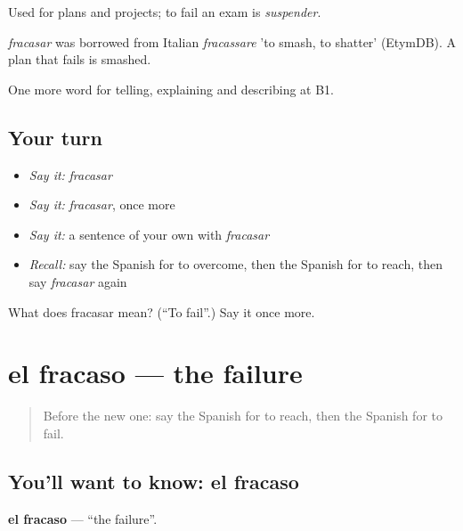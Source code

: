 Used for plans and projects; to fail an exam is \emph{suspender}.

\begin{cousinweb}
\emph{fracasar} was borrowed from Italian \emph{fracassare} 'to smash, to shatter' (EtymDB). A plan that fails is smashed.
\end{cousinweb}

\begin{grammarlens}[title={What you've built}]
One more word for telling, explaining and describing at B1.
\end{grammarlens}

\subsection*{Your turn}
\begin{itemize}
\raggedright
  \item \emph{Say it:} \emph{fracasar}
  \item \emph{Say it:} \emph{fracasar}, once more
  \item \emph{Say it:} a sentence of your own with \emph{fracasar}
  \item \emph{Recall:} say the Spanish for to overcome, then the Spanish for to reach, then say \emph{fracasar} again
\end{itemize}

\begin{tcolorbox}[breakable,colback=teal!4,colframe=teal!35!black,title={Before you move on}]
What does fracasar mean? (\textquotedblleft{}To fail\textquotedblright{}.) Say it once more.
\end{tcolorbox}
\section[el fracaso]{el fracaso — the failure}

\label{lesson:ES-C573-fracaso}



\begin{quote}
Before the new one: say the Spanish for to reach, then the Spanish for to fail.
\end{quote}

\subsection*{You'll want to know: el fracaso}
\textbf{el fracaso} — \textquotedblleft{}the failure\textquotedblright{}.

